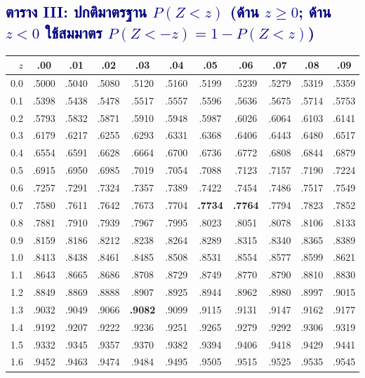 \documentclass[9pt]{extarticle}
\begin{document}
\subsection*{\textcolor{navy}{ตาราง III: ปกติมาตรฐาน $P(Z<z)$ (ด้าน $z\ge0$; ด้าน $z<0$ ใช้สมมาตร $P(Z{<}{-z})=1-P(Z{<}z)$)}}
\begin{center}
{\scriptsize
\begin{tabular}{r|cccccccccc}
\rowcolor{lightbg} $z$ & .00 & .01 & .02 & .03 & .04 & .05 & .06 & .07 & .08 & .09\\\hline
0.0 & .5000 & .5040 & .5080 & .5120 & .5160 & .5199 & .5239 & .5279 & .5319 & .5359\\
0.1 & .5398 & .5438 & .5478 & .5517 & .5557 & .5596 & .5636 & .5675 & .5714 & .5753\\
0.2 & .5793 & .5832 & .5871 & .5910 & .5948 & .5987 & .6026 & .6064 & .6103 & .6141\\
0.3 & .6179 & .6217 & .6255 & .6293 & .6331 & .6368 & .6406 & .6443 & .6480 & .6517\\
0.4 & .6554 & .6591 & .6628 & .6664 & .6700 & .6736 & .6772 & .6808 & .6844 & .6879\\
0.5 & .6915 & .6950 & .6985 & .7019 & .7054 & .7088 & .7123 & .7157 & .7190 & .7224\\
0.6 & .7257 & .7291 & .7324 & .7357 & .7389 & .7422 & .7454 & .7486 & .7517 & .7549\\
0.7 & .7580 & .7611 & .7642 & .7673 & .7704 & \textbf{.7734} & \textbf{.7764} & .7794 & .7823 & .7852\\
0.8 & .7881 & .7910 & .7939 & .7967 & .7995 & .8023 & .8051 & .8078 & .8106 & .8133\\
0.9 & .8159 & .8186 & .8212 & .8238 & .8264 & .8289 & .8315 & .8340 & .8365 & .8389\\
1.0 & .8413 & .8438 & .8461 & .8485 & .8508 & .8531 & .8554 & .8577 & .8599 & .8621\\
1.1 & .8643 & .8665 & .8686 & .8708 & .8729 & .8749 & .8770 & .8790 & .8810 & .8830\\
1.2 & .8849 & .8869 & .8888 & .8907 & .8925 & .8944 & .8962 & .8980 & .8997 & .9015\\
1.3 & .9032 & .9049 & .9066 & \textbf{.9082} & .9099 & .9115 & .9131 & .9147 & .9162 & .9177\\
1.4 & .9192 & .9207 & .9222 & .9236 & .9251 & .9265 & .9279 & .9292 & .9306 & .9319\\
1.5 & .9332 & .9345 & .9357 & .9370 & .9382 & .9394 & .9406 & .9418 & .9429 & .9441\\
1.6 & .9452 & .9463 & .9474 & .9484 & .9495 & .9505 & .9515 & .9525 & .9535 & .9545\\

\end{tabular}}
\end{center}
\end{document}
